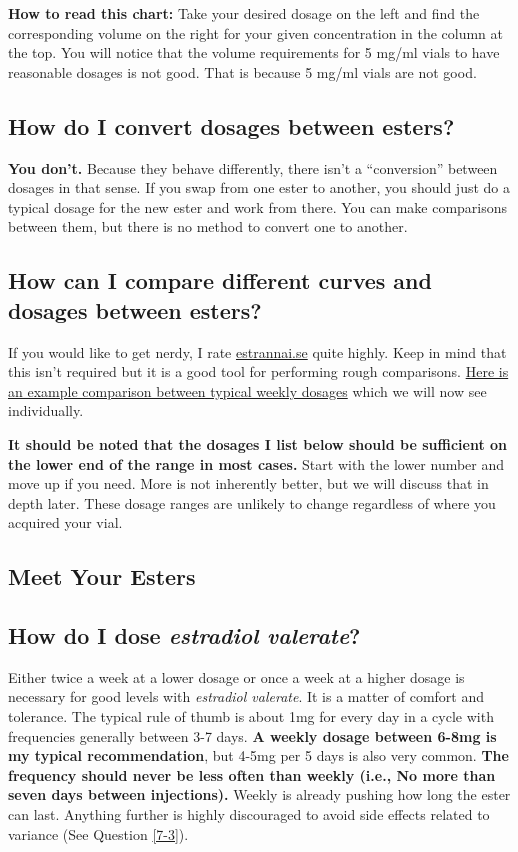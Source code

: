 \documentclass{article}
\begin{document}
\textbf{How to read this chart:} Take your desired dosage on the left and find the corresponding volume on the right for your given concentration in the column at the top. You will notice that the volume requirements for 5 mg/ml vials to have reasonable dosages is not good. That is because 5 mg/ml vials are not good. 

\subsection{How do I convert dosages between esters?}

\textbf{You don’t. }Because they behave differently, there isn’t a “conversion” between dosages in that sense. If you swap from one ester to another, you should just do a typical dosage for the new ester and work from there. You can make comparisons between them, but there is no method to convert one to another.

\subsection{How can I compare different curves and dosages between esters?}

If you would like to get nerdy, I rate \href{http://estrannai.se}{estrannai.se} quite highly. Keep in mind that this isn’t required but it is a good tool for performing rough comparisons. \href{https://estrannai.se/\#i0__cu,7,7,1-cu,5,7,3-cu,5,7,2}{Here is an example comparison between typical weekly dosages} which we will now see individually.

\textbf{It should be noted that the dosages I list below should be sufficient on the lower end of the range in most cases.} Start with the lower number and move up if you need. More is not inherently better, but we will discuss that in depth later. These dosage ranges are unlikely to change regardless of where you acquired your vial.

\subsection*{Meet Your Esters}

\subsection{How do I dose \textit{estradiol valerate}?}

Either twice a week at a lower dosage or once a week at a higher dosage is necessary for good levels with \textit{estradiol valerate}. It is a matter of comfort and tolerance. The typical rule of thumb is about 1mg for every day in a cycle with frequencies generally between 3-7 days. \textbf{A weekly dosage between 6-8mg is my typical recommendation}, but 4-5mg per 5 days is also very common. \textbf{The frequency should never be less often than weekly (i.e., No more than seven days between injections).} Weekly is already pushing how long the ester can last. Anything further is highly discouraged to avoid side effects related to variance (See Question \ref{7-3}).
\end{document}
